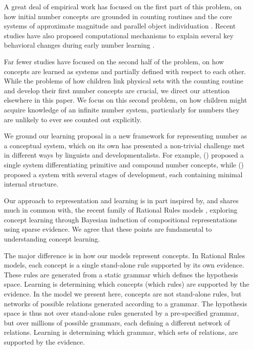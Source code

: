 \documentclass[10pt,letterpaper]{article}
\begin{document}
A great deal of empirical work has focused on the first part of this
problem, on how initial number concepts are grounded in counting
routines and the core systems of approximate magnitude and parallel
object individuation
\citep{Car2009,dehaene2011number,feigenson2004core}. Recent studies
have also proposed computational mechanisms to explain several key
behavioral changes during early number learning
\citep{PianGoodTen2012}.

Far fewer studies have focused on the second half of the problem, on
how concepts are learned as systems and partially defined with respect
to each other. While the problems of how children link physical sets
with the counting routine and develop their first number concepts are
crucial, we direct our attention elsewhere in this paper. We focus on
this second problem, on how children might acquire knowledge of an
infinite number system, particularly for numbers they are unlikely to
ever see counted out explicitly.

We ground our learning proposal in a new framework for representing
number as a conceptual system, which on its own has presented a
non-trivial challenge met in different ways by linguists and
developmentalists. For example, \citeauthor{hurford1975linguistic}
(\citeyear{hurford1975linguistic}) proposed a single system
differentiating primitive and compound number concepts, while
\citeauthor{siegler1982development}
(\citeyear{siegler1982development}) proposed a system with several
stages of development, each containing minimal internal structure.

Our approach to representation and learning is in part inspired by,
and shares much in common with, the recent family of Rational Rules
models
\citep{goodman2008rational,T.D.Ullman:2012:1b1b6,PianGoodTen2012},
exploring concept learning through Bayesian induction of compositional
representations using sparse evidence. We agree that these points are
fundamental to understanding concept learning.

The major difference is in how our models represent concepts. In
Rational Rules models, each concept is a single stand-alone rule
supported by its own evidence. These rules are generated from a static
grammar which defines the hypothesis space. Learning is determining
which concepts (which rules) are supported by the evidence. In the
model we present here, concepts are not stand-alone rules, but
networks of possible relations generated according to a grammar. The
hypothesis space is thus not over stand-alone rules generated by a
pre-specified grammar, but over millions of possible grammars, each
defining a different network of relations. Learning is determining
which grammar, which sets of relations, are supported by the evidence.
\end{document}
